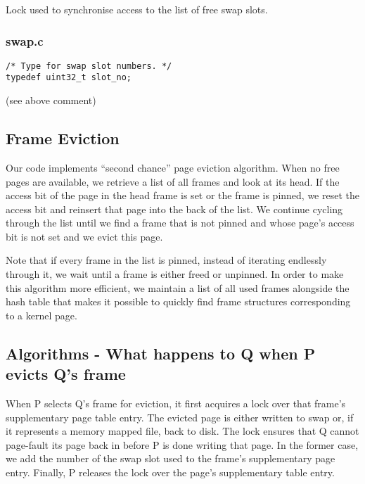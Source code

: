 Lock used to synchronise access to the list of free swap slots.

\subsubsection*{swap.c}

\begin{verbatim}
/* Type for swap slot numbers. */
typedef uint32_t slot_no;
\end{verbatim}

(see above comment)

\subsection{Frame Eviction}

Our code implements ``second chance'' page eviction algorithm.
When no free pages are available, we retrieve a list of all frames and look at its head.
If the access bit of the page in the head frame is set or the frame is pinned, we reset the access bit and reinsert that page into the back of the list.
We continue cycling through the list until we find a frame that is not pinned and whose page's access bit is not set and we evict this page.

Note that if every frame in the list is pinned, instead of iterating endlessly through it, we wait until a frame is either freed or unpinned.
In order to make this algorithm more efficient, we maintain a list of all used frames alongside the hash table that makes it possible to quickly find frame structures corresponding to a kernel page.

\subsection{Algorithms - What happens to Q when P evicts Q's frame}

When P selects Q's frame for eviction, it first acquires a lock over that frame's supplementary page table entry.
The evicted page is either written to swap or, if it represents a memory mapped file, back to disk.
The lock ensures that Q cannot page-fault its page back in before P is done writing that page.
In the former case, we add the number of the swap slot used to the frame's supplementary page entry.
Finally, P releases the lock over the page's supplementary table entry.

